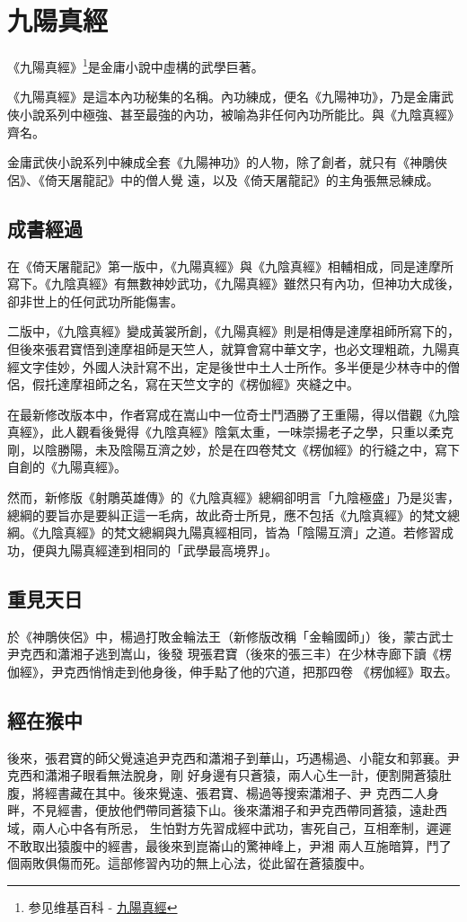 \chapter{九陽真經}
《九陽真經》\footnote{参见维基百科 - \href{http://zh.wikipedia.org/wiki/\%E4\%B9\%9D\%E9\%99\%BD\%E7\%9C\%9F\%E7\%B6\%93}{九陽真經}}是金庸小說中虛構的武學巨著\cite{jyangzj}。

《九陽真經》是這本內功秘集的名稱。內功練成，便名《九陽神功》，乃是金庸武俠小說系列中極強、甚至最強的內功，被喻為非任何內功所能比。與《九陰真經》齊名。

金庸武俠小說系列中練成全套《九陽神功》的人物，除了創者，就只有《神鵰俠侶》、《倚天屠龍記》中的僧人覺
遠，以及《倚天屠龍記》的主角張無忌練成。

\section{成書經過}
在《倚天屠龍記》第一版中，《九陽真經》與《九陰真經》相輔相成，同是達摩所寫下。《九陰真經》有無數神妙武功，《九陽真經》雖然只有內功，但神功大成後，卻非世上的任何武功所能傷害。

二版中，《九陰真經》變成黃裳所創，《九陽真經》則是相傳是達摩祖師所寫下的，但後來張君寶悟到達摩祖師是天竺人，就算會寫中華文字，也必文理粗疏，九陽真經文字佳妙，外國人決計寫不出，定是後世中土人士所作。多半便是少林寺中的僧侶，假托達摩祖師之名，寫在天竺文字的《楞伽經》夾縫之中。

在最新修改版本中，作者寫成在嵩山中一位奇士鬥酒勝了王重陽，得以借觀《九陰真經》，此人觀看後覺得《九陰真經》陰氣太重，一味崇揚老子之學，只重以柔克剛，以陰勝陽，未及陰陽互濟之妙，於是在四卷梵文《楞伽經》的行縫之中，寫下自創的《九陽真經》。

然而，新修版《射鵰英雄傳》的《九陰真經》總綱卻明言「九陰極盛」乃是災害，總綱的要旨亦是要糾正這一毛病，故此奇士所見，應不包括《九陰真經》的梵文總綱。《九陰真經》的梵文總綱與九陽真經相同，皆為「陰陽互濟」之道。若修習成功，便與九陽真經達到相同的「武學最高境界」。
\section{重見天日}
於《神鵰俠侶》中，楊過打敗金輪法王（新修版改稱「金輪國師」）後，蒙古武士尹克西和瀟湘子逃到嵩山，後發
現張君寶（後來的張三丰）在少林寺廊下讀《楞伽經》，尹克西悄悄走到他身後，伸手點了他的穴道，把那四卷
《楞伽經》取去。


\section{經在猴中}
後來，張君寶的師父覺遠追尹克西和瀟湘子到華山，巧遇楊過、小龍女和郭襄。尹克西和瀟湘子眼看無法脫身，剛
好身邊有只蒼猿，兩人心生一計，便割開蒼猿肚腹，將經書藏在其中。後來覺遠、張君寶、楊過等搜索瀟湘子、尹
克西二人身畔，不見經書，便放他們帶同蒼猿下山。後來瀟湘子和尹克西帶同蒼猿，遠赴西域，兩人心中各有所忌，
生怕對方先習成經中武功，害死自己，互相牽制，遲遲不敢取出猿腹中的經書，最後來到崑崙山的驚神峰上，尹湘
兩人互施暗算，鬥了個兩敗俱傷而死。這部修習內功的無上心法，從此留在蒼猿腹中。

